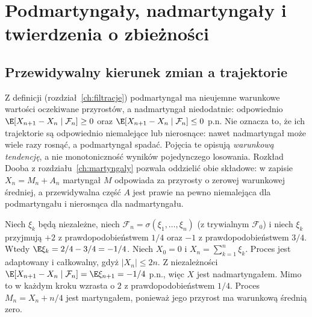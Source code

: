 \chapter{Podmartyngały, nadmartyngały i twierdzenia o zbieżności}
\label{ch:nadmartyngaly}

\section{Przewidywalny kierunek zmian a trajektorie}

Z definicji (rozdział~\ref{ch:filtracje})
podmartyngał ma nieujemne warunkowe wartości
oczekiwane przyrostów, a nadmartyngał niedodatnie:
odpowiednio $\E[X_{n+1}-X_n\mid\mathcal F_n]\geq0$
oraz $\E[X_{n+1}-X_n\mid\mathcal F_n]\leq0$ p.n. Nie oznacza to,
że ich trajektorie są odpowiednio niemalejące
lub nierosnące: nawet nadmartyngał może
wiele razy rosnąć, a podmartyngał spadać.
Pojęcia te opisują \emph{warunkową tendencję},
a nie monotoniczność wyników pojedynczego losowania.
Rozkład Dooba z rozdziału~\ref{ch:martyngaly}
pozwala oddzielić obie składowe: w zapisie
$X_n=M_n+A_n$ martyngał $M$ odpowiada za
przyrosty o zerowej warunkowej średniej, a
przewidywalna część $A$ jest prawie na pewno
niemalejąca dla podmartyngału i nierosnąca
dla nadmartyngału.

\begin{przyklad}
Niech $\xi_k$ będą niezależne, niech
$\mathcal F_n=\sigma(\xi_1,\ldots,\xi_n)$ (z trywialnym
$\mathcal F_0$) i niech $\xi_k$ przyjmują
$+2$ z prawdopodobieństwem $1/4$ oraz $-1$
z prawdopodobieństwem $3/4$. Wtedy
$\E\xi_k=2/4-3/4=-1/4$.
Niech $X_0=0$ i $X_n=\sum_{k=1}^n\xi_k$.
Proces jest adaptowany i całkowalny, gdyż
$|X_n|\leq2n$. Z niezależności
$\E[X_{n+1}-X_n\mid\mathcal F_n]=\E\xi_{n+1}
=-1/4$ p.n., więc $X$ jest nadmartyngałem.
Mimo to w każdym kroku wzrasta o $2$
z prawdopodobieństwem $1/4$.
Proces $M_n=X_n+n/4$ jest martyngałem,
ponieważ jego przyrost ma warunkową średnią zero.
\end{przyklad}

